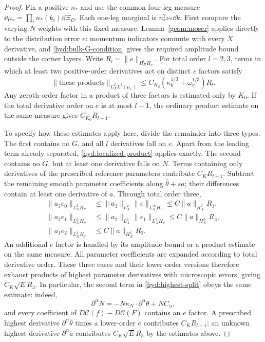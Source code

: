 \begin{proof}
 Fix a positive $n_*$ and use the common four-leg measure
 $\dd\mu_*=\prod_i n_*(k_i)\dd\Xi_D$. Each one-leg marginal is
 $n_*^2\nu_*\dd k$. First compare the varying $N$ weights with this
 fixed measure. Lemma~\ref{geom:moser} applies directly to the
 distribution error $e$: momentum indicators commute with every
 $X$ derivative, and \eqref{hyd:bulk-G-condition} gives the required
 amplitude bound outside the corner layers. Write
 $R_l=\|e\|_{H_X^lH_\nu}$. For total order $l=2,3$, terms in which
 at least two positive-order derivatives act on distinct $e$ factors
 satisfy
 \begin{equation}\label{hyd:localized-product}
 \|\text{these products}\|_{L_X^2L^2(\mu_*)}
 \le C_{K_0}(\kappa_b^{1/3}+\omega_\eta^{1/3})R_l.
 \end{equation}
 Any zeroth-order factor in a product of three factors is estimated
 only by $K_0$. If the total derivative order on $e$ is at most $l-1$,
 the ordinary product estimate on the same measure gives
 $C_{K_0}R_{l-1}$.

 To specify how these estimates apply here, divide the remainder into
 three types. The first contains no $G$, and all $l$ derivatives fall
 on $e$. Apart from the leading term already separated,
 \eqref{hyd:localized-product} applies exactly. The second contains no
 $G$, but at least one derivative falls on $N$. Terms containing only
 derivatives of the prescribed reference parameters contribute
 $C_KR_{l-1}$. Subtract the remaining smooth parameter coefficients
 along $\bar\theta+sa$; their differences contain at least one derivative
 of $a$. Through total order three,
 \begin{align*}
 \|a_3 e_0\|_{L_X^2H_\nu}
      &\le\|a_3\|_{L_X^2}\|e\|_{L_X^\infty H_\nu}
       \le C\|a\|_{H_X^3}R_3,\\
 \|a_2 e_1\|_{L_X^2H_\nu}
      &\le\|a_2\|_{L_X^6}\|e_1\|_{L_X^3H_\nu}
       \le C\|a\|_{H_X^3}R_3,\\
 \|a_1 e_2\|_{L_X^2H_\nu}
      &\le C\|a\|_{H_X^3}R_3.
 \end{align*}
 An additional $e$ factor is handled by its amplitude bound or a product
 estimate on the same measure. All parameter coefficients are expanded
 according to total derivative order. These three cases and their
 lower-order versions therefore exhaust products of highest parameter
 derivatives with microscopic errors, giving $C_K\sqrt E R_3$.
 In particular, the second term in \eqref{hyd:highest-split} obeys the
 same estimate: indeed,
 \[
 \partial^\alpha N=-N\kappa_N\cdot\partial^\alpha\theta+NC_\alpha,
 \]
 and every coefficient of $D\mathcal C(f)-D\mathcal C(F)$ contains an
 $e$ factor. A prescribed highest derivative
 $\partial^\alpha\bar\theta$ times a lower-order $e$ contributes
 $C_KR_{l-1}$; an unknown highest derivative $\partial^\alpha a$
 contributes $C_K\sqrt E R_3$ by the estimates above.


\end{proof}
